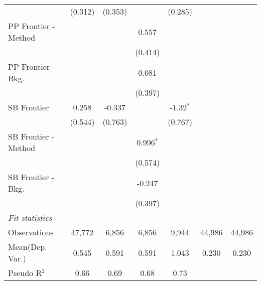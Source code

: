 \begin{tabular}{lcccccc}
                        & (0.312)      & (0.353)       &               & (0.285)     &        &   \\   
   PP Frontier - Method &              &               & 0.557         &             &        &   \\   
                        &              &               & (0.414)       &             &        &   \\   
   PP Frontier - Bkg.   &              &               & 0.081         &             &        &   \\   
                        &              &               & (0.397)       &             &        &   \\   
   SB Frontier          & 0.258        & -0.337        &               & -1.32$^{*}$ &        &   \\   
                        & (0.544)      & (0.763)       &               & (0.767)     &        &   \\   
   SB Frontier - Method &              &               & 0.996$^{*}$   &             &        &   \\   
                        &              &               & (0.574)       &             &        &   \\   
   SB Frontier - Bkg.   &              &               & -0.247        &             &        &   \\   
                        &              &               & (0.397)       &             &        &   \\   
   \midrule
   \emph{Fit statistics}\\
   Observations         & 47,772       & 6,856         & 6,856         & 9,944       & 44,986 & 44,986\\  
Mean(Dep. Var.) & 0.545 & 0.591 & 0.591 & 1.043 & 0.230 & 0.230 \\
   Pseudo R$^2$         & 0.66         & 0.69          & 0.68          & 0.73        &        & \\  
   

\end{tabular}
